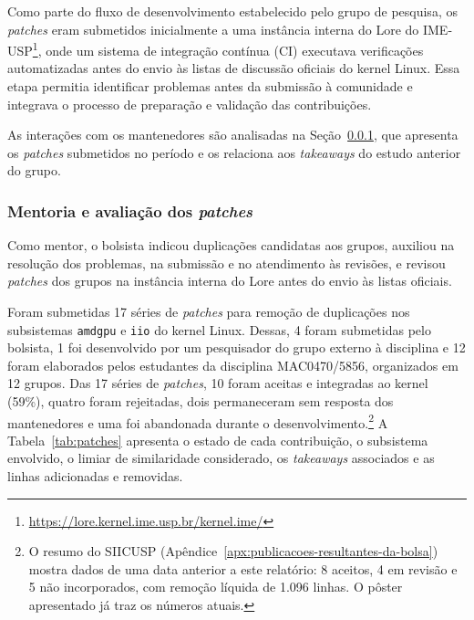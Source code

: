 \documentclass[oneside]{abntlatex}
\begin{document}
Como parte do fluxo de desenvolvimento estabelecido pelo grupo de pesquisa, os \textit{patches} eram submetidos inicialmente a uma instância interna do Lore do IME-USP\footnote{\url{https://lore.kernel.ime.usp.br/kernel.ime/}}, onde um sistema de integração contínua (CI) executava verificações automatizadas antes do envio às listas de discussão oficiais do kernel Linux. Essa etapa permitia identificar problemas antes da submissão à comunidade e integrava o processo de preparação e validação das contribuições.

As interações com os mantenedores são analisadas na Seção~\ref{sec:mentoria}, que apresenta os \textit{patches} submetidos no período e os relaciona aos \textit{takeaways} do estudo anterior do grupo\cite{duplicationdry}.

\subsubsection{Mentoria e avaliação dos \textit{patches}}\label{sec:mentoria}


Como mentor, o bolsista indicou duplicações candidatas aos grupos, auxiliou na resolução dos problemas, na submissão e no atendimento às revisões, e revisou \textit{patches} dos grupos na instância interna do Lore antes do envio às listas oficiais.

Foram submetidas 17 séries de \textit{patches} para remoção de duplicações nos subsistemas \texttt{amdgpu} e \texttt{iio} do kernel Linux. Dessas, 4 foram submetidas pelo bolsista, 1 foi desenvolvido por um pesquisador do grupo externo à disciplina e 12 foram elaborados pelos estudantes da disciplina MAC0470/5856, organizados em 12 grupos. Das 17 séries de \textit{patches}, 10 foram aceitas e integradas ao kernel (59\%), quatro foram rejeitadas, dois permaneceram sem resposta dos mantenedores e uma foi abandonada durante o desenvolvimento.\footnote{O resumo do SIICUSP (Apêndice~\ref{apx:publicacoes-resultantes-da-bolsa}) mostra dados de uma data anterior a este relatório: 8 aceitos, 4 em revisão e 5 não incorporados, com remoção líquida de 1.096 linhas. O pôster apresentado já traz os números atuais.} A Tabela~\ref{tab:patches} apresenta o estado de cada contribuição, o subsistema envolvido, o limiar de similaridade considerado, os \textit{takeaways} associados e as linhas adicionadas e removidas.
\end{document}

